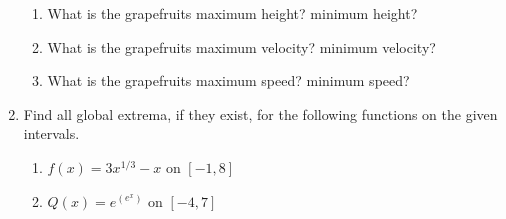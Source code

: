 \documentclass[11pt]{article}
\begin{document}
\begin{enumerate}
\begin{enumerate}
  \item What is the grapefruits maximum height? minimum height?
    \vfill
    
    \newpage

  \item What is the grapefruits maximum velocity? minimum velocity?
    
    \vfill
    
  \item What is the grapefruits maximum speed? minimum speed?
    
    \vfill
    
  \end{enumerate}

  \newpage

\item Find all global extrema, if they exist, for the following
  functions on the given intervals.
  \begin{enumerate}
 \item $f(x)=3x^{1/3}-x$ on $[-1,8]$
  
    \vfill
  
  \item $\displaystyle Q(x)=e^{\left(e^x\right)}$ on $[-4,7]$
    \vfill

  \end{enumerate}

  

\end{enumerate}
\end{document}
